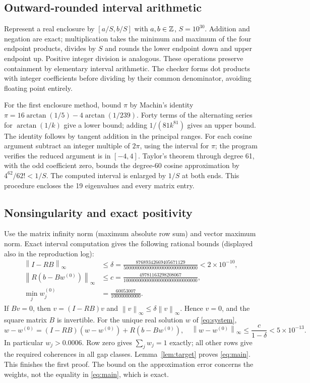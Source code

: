 \documentclass[11pt,a4paper]{article}
\newcommand{\norm}[1]{\left\lVert #1\right\rVert_\infty}
\begin{document}
\subsection{Outward-rounded interval arithmetic}
Represent a real enclosure by $[a/S,b/S]$ with $a,b\in\mathbb Z$, $S=10^{30}$. Addition and negation are exact; multiplication takes the minimum and maximum of the four endpoint products, divides by $S$ and rounds the lower endpoint down and upper endpoint up. Positive integer division is analogous. These operations preserve containment by elementary interval arithmetic. The checker forms dot products with integer coefficients before dividing by their common denominator, avoiding floating point entirely.

For the first enclosure method, bound $\pi$ by Machin's identity $\pi=16\arctan(1/5)-4\arctan(1/239)$. Forty terms of the alternating series for $\arctan(1/k)$ give a lower bound; adding $1/(81k^{81})$ gives an upper bound. The identity follows by tangent addition in the principal ranges. For each cosine argument subtract an integer multiple of $2\pi$, using the interval for $\pi$; the program verifies the reduced argument is in $[-4,4]$. Taylor's theorem through degree 61, with the odd coefficient zero, bounds the degree-60 cosine approximation by $4^{62}/62!<1/S$. The computed interval is enlarged by $1/S$ at both ends. This procedure encloses the 19 eigenvalues and every matrix entry.
\subsection{Nonsingularity and exact positivity}
Use the matrix infinity norm (maximum absolute row sum) and vector maximum norm. Exact interval computation gives the following rational bounds (displayed also in the reproduction log):
\begin{align}
\norm{I-RB}&\le\delta=\frac{87689342669405671129}{500000000000000000000000000000}<2\times10^{-10},\label{eq:defect}\\
\norm{R(b-Bw^{(0)})}&\le c=\frac{49781163298208067}{100000000000000000000000000000},\\
\min_j w_j^{(0)}&=\frac{60053007}{100000000000}.
\end{align}
If $Bv=0$, then $v=(I-RB)v$ and $\norm v\le\delta\norm v$. Hence $v=0$, and the square matrix $B$ is invertible. For the unique real solution $w$ of \eqref{eq:system},
\[
w-w^{(0)}=(I-RB)(w-w^{(0)})+R(b-Bw^{(0)}),\quad
\norm{w-w^{(0)}}\le\frac{c}{1-\delta}<5\times10^{-13}.
\]
In particular $w_j>0.0006$. Row zero gives $\sum_j w_j=1$ exactly; all other rows give the required coherences in all gap classes. Lemma~\ref{lem:target} proves \eqref{eq:main}. This finishes the first proof. The bound on the approximation error concerns the weights, not the equality in \eqref{eq:main}, which is exact.
\end{document}
